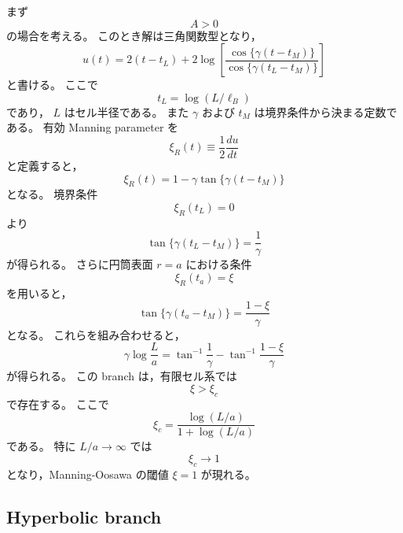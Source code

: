 \documentclass[11pt,a4paper]{ltjsarticle}
\theoremstyle{definition}
\theoremstyle{remark}
\begin{document}
まず
\begin{equation}
A>0
\end{equation}
の場合を考える。
このとき解は三角関数型となり，
\begin{equation}
u(t)
=
2(t-t_L)
+
2\log
\left[
\frac{
\cos\{\gamma(t-t_M)\}
}{
\cos\{\gamma(t_L-t_M)\}
}
\right]
\label{trig_solution}
\end{equation}
と書ける。
ここで
\begin{equation}
t_L=\log(L/\ell_B)
\end{equation}
であり，
\(L\)
はセル半径である。
また
\(\gamma\)
および
\(t_M\)
は境界条件から決まる定数である。
有効 Manning parameter を
\begin{equation}
\xi_R(t)
\equiv
\frac12\frac{du}{dt}
\label{xiR_def}
\end{equation}
と定義すると，
\begin{equation}
\xi_R(t)
=
1-\gamma \tan\{\gamma(t-t_M)\}
\label{xiR_trig}
\end{equation}
となる。
境界条件
\begin{equation}
\xi_R(t_L)=0
\end{equation}
より
\begin{equation}
\tan\{\gamma(t_L-t_M)\}
=\frac1\gamma
\label{boundary_trig_1}
\end{equation}
が得られる。
さらに円筒表面
\(r=a\)
における条件
\begin{equation}
\xi_R(t_a)=\xi
\end{equation}
を用いると，
\begin{equation}
\tan\{\gamma(t_a-t_M)\}
=\frac{1-\xi}{\gamma}
\label{boundary_trig_2}
\end{equation}
となる。
これらを組み合わせると，
\begin{equation}
\gamma \log\frac{L}{a}
=
\tan^{-1}\frac1\gamma
-
\tan^{-1}\frac{1-\xi}{\gamma}
\label{gamma_equation}
\end{equation}
が得られる。
この branch は，有限セル系では
\begin{equation}
\xi>\xi_c
\end{equation}
で存在する。
ここで
\begin{equation}
\xi_c
=
\frac{\log(L/a)}{1+\log(L/a)}
\label{xi_c}
\end{equation}
である。
特に
\(L/a\to\infty\)
では
\begin{equation}
\xi_c\to1
\end{equation}
となり，Manning-Oosawa の閾値
\(\xi=1\)
が現れる。


\subsection{Hyperbolic branch}
\end{document}
